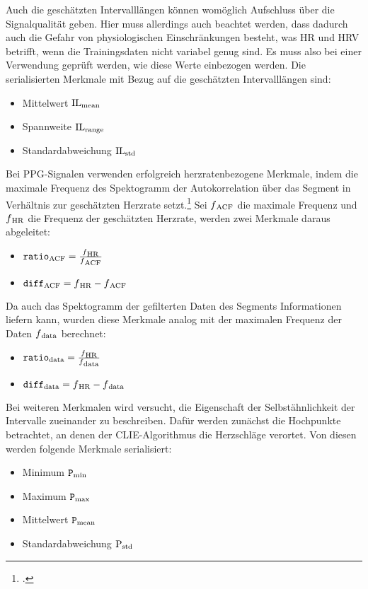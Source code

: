 Auch die geschätzten Intervalllängen können womöglich Aufschluss über die Signalqualität geben. Hier muss allerdings auch beachtet werden, dass dadurch auch die Gefahr von physiologischen Einschränkungen besteht, was \acl{HR} und \acl{HRV} betrifft, wenn die Trainingsdaten nicht variabel genug sind. Es muss also bei einer Verwendung geprüft werden, wie diese Werte einbezogen werden. Die serialisierten Merkmale mit Bezug auf die geschätzten Intervalllängen sind:

\begin{itemize}
	\item Mittelwert $\text{IL}\textsubscript{mean}$
	\item Spannweite $\text{IL}\textsubscript{range}$
	\item Standardabweichung $\text{IL}\textsubscript{std}$
\end{itemize}

Bei \ac{PPG}-Signalen verwenden \citeauthor{Yu2020} erfolgreich herzratenbezogene Merkmale, indem die maximale Frequenz des Spektogramm der Autokorrelation über das Segment in Verhältnis zur geschätzten Herzrate setzt.\footcite{Yu2020} Sei $f\textsubscript{ACF}$ die maximale Frequenz und $f\textsubscript{HR}$ die Frequenz der geschätzten Herzrate, werden zwei Merkmale daraus abgeleitet:
\begin{itemize}
 	\item $\texttt{ratio}\textsubscript{ACF} = \frac{f\textsubscript{HR}}{f\textsubscript{ACF}}$
 	\item $\texttt{diff}\textsubscript{ACF} = f\textsubscript{HR} - f\textsubscript{ACF}$
\end{itemize}
 
 Da auch das Spektogramm der gefilterten Daten des Segments Informationen liefern kann, wurden diese Merkmale analog mit der maximalen Frequenz der Daten $f\textsubscript{data}$ berechnet:
 \begin{itemize}
 	\item $\texttt{ratio}\textsubscript{data} = \frac{f\textsubscript{HR}}{f\textsubscript{data}}$
 	\item $\texttt{diff}\textsubscript{data} = f\textsubscript{HR} - f\textsubscript{data}$
 \end{itemize}

Bei weiteren Merkmalen wird versucht, die Eigenschaft der Selbstähnlichkeit der Intervalle zueinander zu beschreiben. Dafür werden zunächst die Hochpunkte betrachtet, an denen der \ac{CLIE}-Algorithmus die Herzschläge verortet. Von diesen werden folgende Merkmale serialisiert:
\begin{itemize}
	\item Minimum $\texttt{P}\textsubscript{min}$
	\item Maximum $\texttt{P}\textsubscript{max}$
	\item Mittelwert $\texttt{P}\textsubscript{mean}$
	\item Standardabweichung $\text{P}\textsubscript{std}$
\end{itemize}

